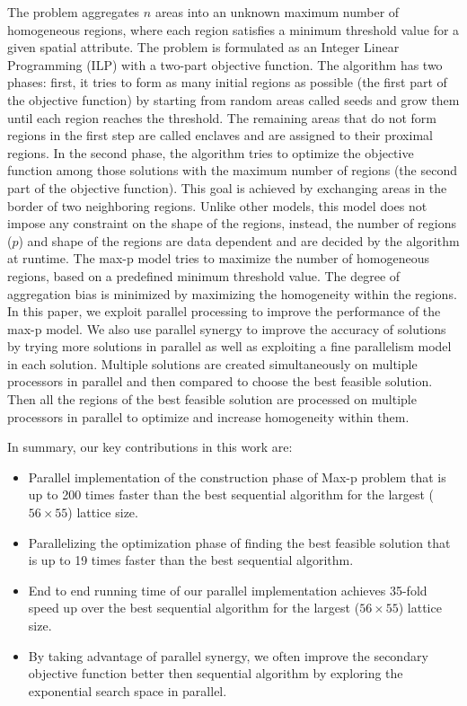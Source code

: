 \documentclass[conference]{IEEEtran}
\begin{document}
The problem aggregates $n$ areas into an unknown maximum number of homogeneous regions, where each region satisfies a minimum threshold value for a
given spatial attribute. The problem is formulated as an Integer Linear
Programming (ILP) with a two-part objective function. The algorithm has two
phases: first, it tries to form as many initial regions as possible (the first
part of the objective function) by starting from random areas called seeds and
grow them until each region reaches the threshold. The remaining areas that do
not form regions in the first step are called enclaves and are assigned to their
proximal regions. In the second phase, the algorithm tries to optimize the objective function among those solutions with the maximum number of regions (the second part of the objective function). This goal is achieved by exchanging areas in the border of two neighboring regions. Unlike other models, this model does not impose any constraint on the shape of the regions, instead, the number of regions ($p$) and shape of the regions are data dependent and are decided by the algorithm at runtime. The
max-p model tries to maximize the number of homogeneous regions, based on a predefined minimum threshold value. The degree of aggregation bias is minimized by maximizing the homogeneity within the regions. In this paper, we exploit parallel processing to improve the performance of the max-p model. We also use parallel synergy to improve the accuracy of solutions by trying more solutions in parallel as well as exploiting a fine parallelism model in each solution. Multiple solutions are created simultaneously on multiple processors in parallel and then compared to choose the best feasible solution. Then all the regions of the best feasible solution are processed on multiple processors in parallel to optimize and increase homogeneity within them.

In summary, our key contributions in this work are:
\begin{itemize}

\item Parallel implementation of the construction phase of Max-p problem that is up to 200 times faster than the best sequential algorithm for the largest ($56\times 55$) lattice size.

\item Parallelizing the optimization phase of finding the best feasible solution that is up to 19 times faster than the best sequential algorithm.

\item End to end running time of our parallel implementation achieves 35-fold speed up over the best sequential algorithm for the largest ($56\times 55$) lattice size.

\item By taking advantage of parallel synergy, we often improve the secondary objective function better then sequential algorithm by exploring the exponential search space in parallel.

\end{itemize}
\end{document}
